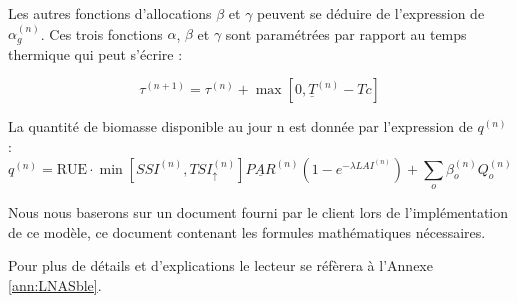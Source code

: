 Les autres fonctions d'allocations $\beta$ et $\gamma$   peuvent se déduire de l'expression de $\alpha_g^{(n)}$.
Ces trois fonctions $\alpha$, $\beta$ et $\gamma$ sont paramétrées par rapport au temps thermique qui peut s'écrire :

\[ {\tau}^{(n+1)}=\tau^{(n)}+\max[0,\underline{T}^{(n)}-Tc] \]

La quantité de biomasse disponible au jour n est donnée par l'expression de $q^{(n)}$ :
\[ 
{q^{(n)}} = \text{RUE}\cdot \min[SSI^{(n)}, TSI_\uparrow^{(n)}]\underline{PAR}^{(n)}(1-e^{-\lambda LAI^{(n)}})+\sum_o \beta_o^{(n)}Q_o^{(n)} 
\]

Nous nous baserons sur un document fourni par le client lors de l'implémentation de ce modèle, ce document contenant les formules mathématiques nécessaires.

Pour plus de détails et d'explications le lecteur se réfèrera à l'Annexe \ref{ann:LNASble}.
